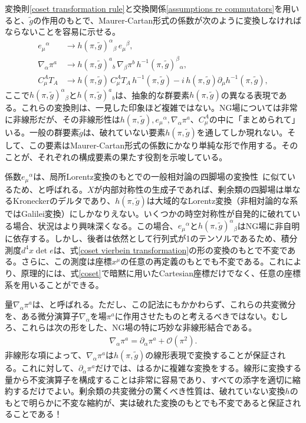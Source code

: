 変換則\eqref{coset transformation rule}と交換関係\eqref{assumptions re commutators}を用いると、$\tilde g$の作用のもとで、Maurer-Cartan形式の係数が次のように変換しなければならないことを容易に示せる。
%
\begin{subequations}
\begin{align}
	 e_\mu{}^\alpha &\to h(\pi, \tilde g)^\alpha{}_\beta \, e_\mu{}^\beta , \label{coset vierbein transformation} \\
	 \nabla_\alpha \pi^a &\to  h(\pi, \tilde g)^a{}_b \, \nabla_\beta \pi^b \,  h^{-1}(\pi, \tilde g)^\beta{}_\alpha ,\\
	  C_\mu^A T_A &\to h (\pi, \tilde g) \, C_\mu^A T_A \, h^{-1} (\pi, \tilde g) - i \,  h(\pi, \tilde g) \partial_\mu h^{-1} (\pi, \tilde g) , \label{coset connection transformation}
\end{align}
\end{subequations}
%
ここで$h(\pi, \tilde g)^\alpha{}_\beta$と$ h(\pi, \tilde g)^a{}_b$は、抽象的な群要素$h(\pi, \tilde g)$の異なる表現である。これらの変換則は、一見した印象ほど複雑ではない。NG場については非常に非線形だが、その非線形性は$h(\pi, \tilde g), e_\mu{}^\alpha, \nabla_\alpha \pi^a$、$C_\mu^A$の中に「まとめられて」いる。一般の群要素$\tilde g$は、破れていない要素$h(\pi, \tilde g)$を通してしか現れない。そして、この要素はMaurer-Cartan形式の係数にかなり単純な形で作用する。そのことが、それぞれの構成要素の果たす役割を示唆している。

係数$e_\mu{}^\alpha$は、局所Lorentz変換のもとでの一般相対論の四脚場の変換性~\cite{Carroll:2004st}に似ているため、と呼ばれる。$X$が内部対称性の生成子であれば、剰余類の四脚場は単なるKroneckerのデルタであり、$h(\pi, \tilde g)$は大域的なLorentz変換（非相対論的な系ではGalilei変換）にしかなりえない。いくつかの時空対称性が自発的に破れている場合、状況はより興味深くなる。この場合、$e_\mu{}^\alpha$と$h(\pi, \tilde g)^\alpha{}_\beta$はNG場に非自明に依存する。しかし、後者は依然として行列式が1のテンソルであるため、積分測度$d^4 x \det e$は、式\eqref{coset vierbein transformation}の形の変換のもとで不変である。さらに、この測度は座標$x^\mu$の任意の再定義のもとでも不変である。これにより、原理的には、式\eqref{coset}で暗黙に用いたCartesian座標だけでなく、任意の座標系を用いることができる。

量$\nabla_\alpha \pi^a$は、と呼ばれる。ただし、この記法にもかかわらず、これらの共変微分を、ある微分演算子$\nabla_\alpha$を場$\pi^a$に作用させたものと考えるべきではない。むしろ、これらは次の形をした、NG場の特に巧妙な非線形結合である。
%
\begin{align}
	\nabla_\alpha \pi^a = \partial_\alpha \pi^a + \mathcal{O}(\pi^2). 
\end{align}
%
非線形な項によって、$\nabla_\alpha \pi^a$は$h(\pi, \tilde g)$の線形表現で変換することが保証される。これに対して、$\partial_\alpha \pi^a $だけでは、はるかに複雑な変換をする。線形に変換する量から不変演算子を構成することは非常に容易であり、すべての添字を適切に縮約するだけでよい。剰余類の共変微分の驚くべき性質は、破れていない変換$h$のもとで明らかに不変な縮約が、実は破れた変換のもとでも不変であると保証されることである！

